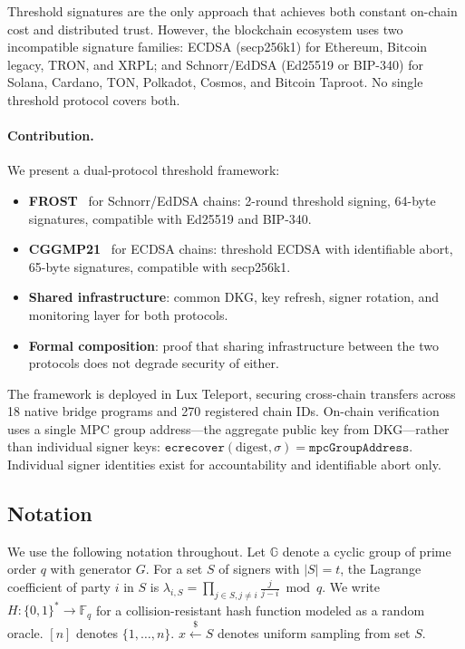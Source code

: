 \documentclass[11pt,twocolumn]{article}
\begin{document}
Threshold signatures are the only approach that achieves both constant on-chain cost
and distributed trust. However, the blockchain ecosystem uses two incompatible
signature families: ECDSA (secp256k1) for Ethereum, Bitcoin legacy, TRON, and XRPL;
and Schnorr/EdDSA (Ed25519 or BIP-340) for Solana, Cardano, TON, Polkadot, Cosmos,
and Bitcoin Taproot. No single threshold protocol covers both.

\paragraph{Contribution.} We present a dual-protocol threshold framework:

\begin{itemize}[nosep]
  \item \textbf{FROST}~\cite{komlo2020frost} for Schnorr/EdDSA chains: 2-round
    threshold signing, 64-byte signatures, compatible with Ed25519 and BIP-340.
  \item \textbf{CGGMP21}~\cite{canetti2021cggmp} for ECDSA chains: threshold ECDSA
    with identifiable abort, 65-byte signatures, compatible with secp256k1.
  \item \textbf{Shared infrastructure}: common DKG, key refresh, signer rotation,
    and monitoring layer for both protocols.
  \item \textbf{Formal composition}: proof that sharing infrastructure between the
    two protocols does not degrade security of either.
\end{itemize}

The framework is deployed in Lux Teleport, securing cross-chain transfers across
18 native bridge programs and 270 registered chain IDs. On-chain verification uses
a single MPC group address---the aggregate public key from DKG---rather than
individual signer keys: $\texttt{ecrecover}(\text{digest}, \sigma) = \texttt{mpcGroupAddress}$.
Individual signer identities exist for accountability and identifiable abort only.

\subsection{Notation}

We use the following notation throughout. Let $\mathbb{G}$ denote a cyclic group of
prime order $q$ with generator $G$. For a set $S$ of signers with $|S| = t$, the
Lagrange coefficient of party $i$ in $S$ is $\lambda_{i,S} = \prod_{j \in S, j \neq i}
\frac{j}{j - i} \bmod q$. We write $H : \{0,1\}^* \to \mathbb{F}_q$ for a
collision-resistant hash function modeled as a random oracle. $[n]$ denotes
$\{1, \ldots, n\}$. $x \xleftarrow{\$} S$ denotes uniform sampling from set $S$.
\end{document}
